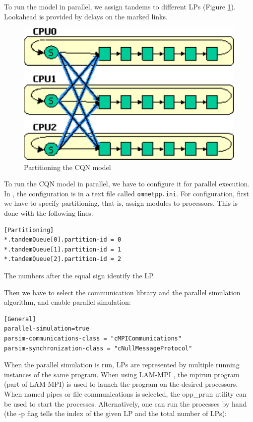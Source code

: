 To run the model in parallel, we assign tandems to different LPs
(Figure \ref{fig:cqn-partitioning}). Lookahead is provided
by delays on the marked links.

\begin{figure}[htbp]
  \begin{center}
    \includegraphics{figures/cqn-partitioning}
    \caption{Partitioning the CQN model}
    \label{fig:cqn-partitioning}
  \end{center}
\end{figure}

To run the CQN model in parallel, we have to configure it for parallel
execution. In {\opp}, the configuration is in a text file called
\texttt{omnetpp.ini}. For configuration, first we have to specify
partitioning, that is, assign modules to processors. This is done
with the following lines:

\begin{verbatim}
[Partitioning]
*.tandemQueue[0].partition-id = 0
*.tandemQueue[1].partition-id = 1
*.tandemQueue[2].partition-id = 2
\end{verbatim}

The numbers after the equal sign identify the LP.

Then we have to select the communication library and the parallel
simulation algorithm, and enable parallel simulation:

\begin{verbatim}
[General]
parallel-simulation=true
parsim-communications-class = "cMPICommunications"
parsim-synchronization-class = "cNullMessageProtocol"
\end{verbatim}

When the parallel simulation is run, LPs are represented
by multiple running instances of the same program.
When using LAM-MPI \cite{lammpi}, the mpirun program (part of LAM-MPI)
is used to launch the program on the desired processors.
When named pipes or file communications is selected, the opp\_prun
{\opp} utility can be used to start the processes.
Alternatively, one can run the processes by hand (the -p flag
tells {\opp} the index of the given LP and the total number of LPs):

